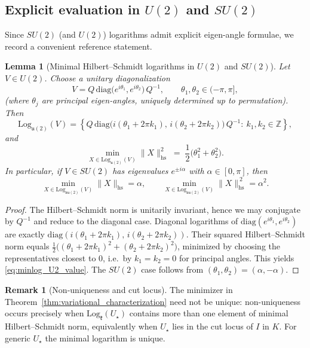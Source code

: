 \documentclass{article}%
\newtheorem{lemma}[theorem]{Lemma}
\theoremstyle{definition}
\newtheorem{remark}[theorem]{Remark}
\numberwithin{equation}{section}
\newcommand{\Log}{\mathrm{Log}}
\newcommand{\diag}{\mathrm{diag}}
\begin{document}
\subsection{Explicit evaluation in $U(2)$ and $SU(2)$}
\label{subsec:explicit_U2_SU2}

Since $SU(2)$ (and $U(2)$) logarithms admit explicit eigen-angle formulae, we record a convenient reference statement.

\begin{lemma}[Minimal Hilbert--Schmidt logarithms in $U(2)$ and $SU(2)$]\label{lem:minlog_U2_eigenangles}
Let $V\in U(2)$. Choose a unitary diagonalization
\[
V = Q\,\diag\!\big(e^{i\theta_1},e^{i\theta_2}\big)\,Q^{-1},
\qquad \theta_1,\theta_2\in(-\pi,\pi],
\]
(where $\theta_j$ are principal eigen-angles, uniquely determined up to permutation).
Then
\[
\Log_{\mathfrak{u}(2)}(V)
=
\left\{
Q\,\diag\!\big(i(\theta_1+2\pi k_1),\,i(\theta_2+2\pi k_2)\big)\,Q^{-1}
:\ k_1,k_2\in\mathbb{Z}
\right\},
\]
and
\begin{equation}\label{eq:minlog_U2_value}
\min_{X\in\Log_{\mathfrak{u}(2)}(V)}\|X\|_{\mathrm{hs}}^2
\;=\;
\frac12\big(\theta_1^2+\theta_2^2\big).
\end{equation}
In particular, if $V\in SU(2)$ has eigenvalues $e^{\pm i\alpha}$ with $\alpha\in[0,\pi]$, then
\[
\min_{X\in\Log_{\mathfrak{su}(2)}(V)}\|X\|_{\mathrm{hs}}=\alpha,
\qquad
\min_{X\in\Log_{\mathfrak{su}(2)}(V)}\|X\|_{\mathrm{hs}}^{\,2}=\alpha^2.
\]
\end{lemma}

\begin{proof}
The Hilbert--Schmidt norm is unitarily invariant, hence we may conjugate by $Q^{-1}$ and reduce to the diagonal case.
Diagonal logarithms of $\diag(e^{i\theta_1},e^{i\theta_2})$ are exactly $\diag(i(\theta_1+2\pi k_1),\,i(\theta_2+2\pi k_2))$.
Their squared Hilbert--Schmidt norm equals
$\tfrac12\big((\theta_1+2\pi k_1)^2+(\theta_2+2\pi k_2)^2\big)$, minimized by choosing the representatives closest to $0$, i.e.\ by
$k_1=k_2=0$ for principal angles. This yields \eqref{eq:minlog_U2_value}. The $SU(2)$ case follows from
$(\theta_1,\theta_2)=(\alpha,-\alpha)$.
\end{proof}

\begin{remark}[Non-uniqueness and cut locus]\label{rem:nonuniqueness_log}
The minimizer in Theorem~\ref{thm:variational_characterization} need not be unique: non-uniqueness occurs precisely when
$\Log_{\mathfrak{k}}(U_{\star})$ contains more than one element of minimal Hilbert--Schmidt norm, equivalently when $U_{\star}$ lies in
the cut locus of $I$ in $K$. For generic $U_{\star}$ the minimal logarithm is unique.
\end{remark}
\end{document}
